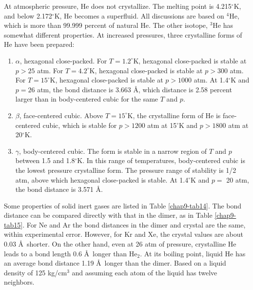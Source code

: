 At atmospheric pressure, He does not crystallize.  The melting point is 
4.215$^{\circ}$K, and below 2.172$^{\circ}$K, He becomes a superfluid.  
All discussions are based on $^4$He, which is more than 99.999 percent 
of natural He.  The other isotope, $^3$He has somewhat different 
properties.  At increased pressures, three crystalline 
forms of He have been prepared:
\begin{enumerate}
\item $\alpha$, hexagonal close-packed.  For $T = 1.2^{\circ}$K,  
hexagonal close-packed is stable at $p > 25$ atm.  For $T = 4.2^{\circ}$K,
hexagonal close-packed is stable at $p > 300$ atm.  For $T = 15^{\circ}$K, 
hexagonal close-packed is stable at $p > 1000$ atm.  At 1.4$^{\circ}$K and 
$p = 26$ atm, the bond distance is 3.663 \AA, which distance is 2.58 
percent larger than in body-centered cubic for the same $T$ and $p$.

\item $\beta$, face-centered cubic.  Above $T = 15^{\circ}$K, the 
crystalline form of He is face-centered cubic, which is stable
for $p > 1200$ atm at 15$^{\circ}$K and $p > 1800$ atm at 20$^{\circ}$K.

\item $\gamma$, body-centered cubic.  The form is stable in a 
narrow region of $T$ and $p$ between 1.5 and 1.8$^{\circ}$K.  In this range of
temperatures, body-centered cubic is the lowest pressure crystalline 
form. The pressure range of stability is 1/2 atm,
above which hexagonal close-packed is stable.  At 1.4$^{\circ}$K and 
$p =$ 20 atm, the bond distance is 3.571 \AA.
\end{enumerate}

Some properties of solid inert gases are listed in Table
\ref{chap9-tab14}. The bond distance can be compared directly with
that in the dimer, as in Table \ref{chap9-tab15}.  For Ne and Ar the
bond distances in the dimer and crystal are the same, within
experimental error.  However, for Kr and Xe, the crystal values are
about 0.03 \AA\ shorter.  On the other hand, even at 26 atm of
pressure, crystalline He leads to a bond length 0.6 \AA\ longer than
He$_2$.  At its boiling point, liquid He has an average bond distance
1.19 \AA\ longer than the dimer.  Based on a liquid density of 125
kg/cm$^3$ and assuming each atom of the liquid has twelve neighbors.

